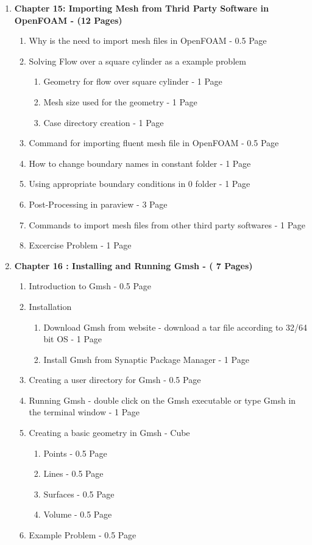 \documentclass[12pt]{article}
\begin{document}
\begin{enumerate}
\item \textbf{Chapter 15: Importing Mesh from Thrid Party Software in OpenFOAM - (12 Pages)}
\begin{enumerate}[label*=\arabic*.]
 \item Why is the need to import mesh files in OpenFOAM - 0.5 Page
 \item Solving Flow over a square cylinder as a example problem 
 \begin{enumerate}[label*=\arabic*.]
 \item Geometry for flow over square cylinder - 1 Page
 \item Mesh size used for the geometry - 1 Page
 \item Case directory creation - 1 Page
 \end{enumerate}
\item Command for importing fluent mesh file in OpenFOAM - 0.5 Page
\item How to change boundary names in constant folder - 1 Page
\item Using appropriate boundary conditions in 0 folder - 1 Page
\item Post-Processing in paraview - 3 Page
\item Commands to import mesh files from other third party softwares - 1 Page
\item Excercise Problem - 1 Page
\end{enumerate}


\item \textbf{Chapter 16 : Installing and Running Gmsh - ( 7 Pages)}
\begin{enumerate}[label*=\arabic*.]
\item Introduction to Gmsh - 0.5 Page
\item Installation 
\begin{enumerate}[label*=\arabic*.]
\item Download Gmsh from website - download a tar file according to 32/64 bit OS - 1 Page
\item Install Gmsh from Synaptic Package Manager - 1 Page
\end{enumerate}
\item Creating a user directory for Gmsh - 0.5 Page
\item Running Gmsh - double click on the Gmsh executable or type Gmsh in the terminal window - 1 Page
\item Creating a basic geometry in Gmsh - Cube 
\begin{enumerate}[label*=\arabic*.]
\item Points  - 0.5 Page
\item Lines - 0.5 Page
\item Surfaces - 0.5 Page
\item Volume - 0.5 Page
\end{enumerate} 
\item Example Problem - 0.5 Page
\end{enumerate}



\end{enumerate}
\end{document}
